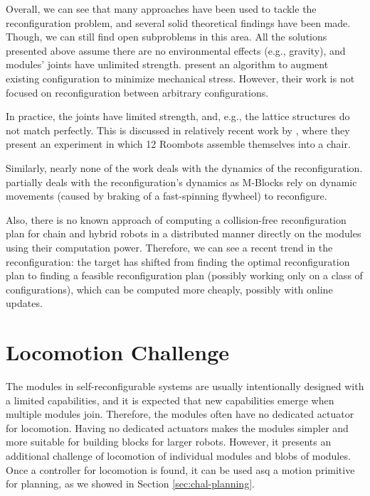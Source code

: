 Overall, we can see that many approaches have been used to tackle the
reconfiguration problem, and several solid theoretical findings have been made.
Though, we can still find open subproblems in this area. All the solutions
presented above assume there are no environmental effects (e.g., gravity), and
modules' joints have unlimited strength. \textcite{DBLP:journals/jr/SuzukiIKK11}
present an algorithm to augment existing configuration to minimize mechanical
stress. However, their work is not focused on reconfiguration between arbitrary
configurations.

In practice, the joints have limited strength, and, e.g., the lattice structures
do not match perfectly. This is discussed in relatively recent work by
\textcite{DBLP:journals/ras/HauserMLKBI20}, where they present an experiment in
which 12 Roombots assemble themselves into a chair.

Similarly, nearly none of the work deals with the dynamics of the
reconfiguration. \textcite{DBLP:conf/iros/RomanishinMR19} partially deals with
the reconfiguration's dynamics as M-Blocks rely on dynamic movements
(caused by braking of a fast-spinning flywheel) to reconfigure.

Also, there is no known approach of computing a collision-free reconfiguration
plan for chain and hybrid robots in a distributed manner directly on the modules
using their computation power. Therefore, we can see a recent trend in the
reconfiguration: the target has shifted from finding the optimal reconfiguration
plan to finding a feasible reconfiguration plan (possibly working only on a
class of configurations), which can be computed more cheaply, possibly with
online updates.

\section{Locomotion Challenge}\label{sec:chal-locomotion}

The modules in self-reconfigurable systems are usually intentionally designed
with a limited capabilities, and it is expected that new capabilities
emerge when multiple modules join. Therefore, the modules often have no
dedicated actuator for locomotion. Having no dedicated actuators makes the
modules simpler and more suitable for building blocks for larger
robots. However, it presents an additional challenge of locomotion of individual
modules and blobs of modules. Once a controller for locomotion is found, it can
be used asq a motion primitive for planning, as we showed in Section
\ref{sec:chal-planning}.

